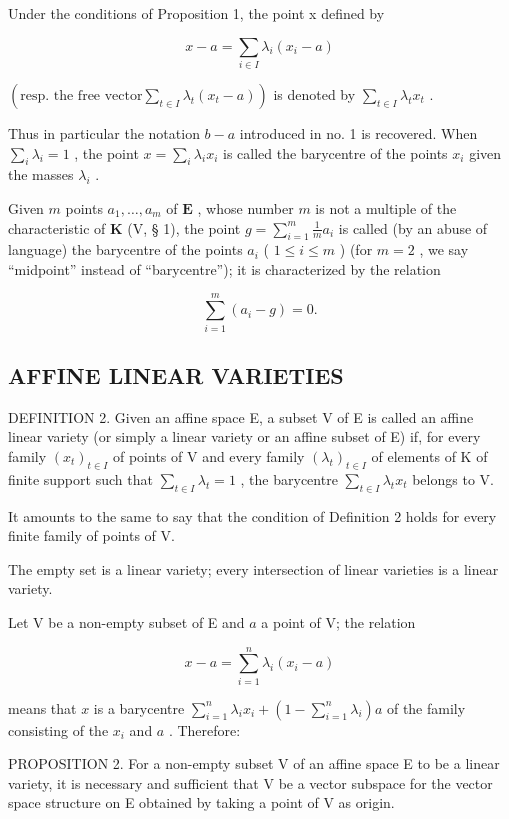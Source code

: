 Under the conditions of Proposition 1, the point x defined by

\[
x - a = \sum_ {i \in I} \lambda_ {i} (x _ {i} - a)
\]

\(\left(\text{resp. the free vector} \sum_{t \in I} \lambda_t(x_t - a)\right)\) is denoted by \(\sum_{t \in I} \lambda_t x_t\) .

Thus in particular the notation \(b - a\) introduced in no. 1 is recovered. When \(\sum_{i} \lambda_{i} = 1\) , the point \(x = \sum_{i} \lambda_{i} x_{i}\) is called the barycentre of the points \(x_{i}\) given the masses \(\lambda_{i}\) .

Given \(m\) points \(a_1, \ldots, a_m\) of \(\mathbf{E}\) , whose number \(m\) is not a multiple of the characteristic of \(\mathbf{K}\) (V, § 1), the point \(g = \sum_{i=1}^{m} \frac{1}{m} a_i\) is called (by an abuse of language) the barycentre of the points \(a_i\) ( \(1 \leqslant i \leqslant m\) ) (for \(m = 2\) , we say ``midpoint'' instead of ``barycentre''); it is characterized by the relation

\[
\sum_ {i = 1} ^ {m} \left(a _ {i} - g\right) = 0.
\]

\subsection{AFFINE LINEAR VARIETIES}

DEFINITION 2. Given an affine space E, a subset V of E is called an affine linear variety (or simply a linear variety or an affine subset of E) if, for every family \((x_{t})_{t\in I}\) of points of V and every family \((\lambda_t)_{t\in I}\) of elements of K of finite support such that \(\sum_{t\in I}\lambda_t = 1\) , the barycentre \(\sum_{t\in I}\lambda_t x_t\) belongs to V.

It amounts to the same to say that the condition of Definition 2 holds for every finite family of points of V.

The empty set is a linear variety; every intersection of linear varieties is a linear variety.

Let V be a non-empty subset of E and \(a\) a point of V; the relation

\[
x - a = \sum_ {i = 1} ^ {n} \lambda_ {i} (x _ {i} - a)
\]

means that \(x\) is a barycentre \(\sum_{i=1}^{n} \lambda_i x_i + \left(1 - \sum_{i=1}^{n} \lambda_i\right)a\) of the family consisting of the \(x_i\) and \(a\) . Therefore:

PROPOSITION 2. For a non-empty subset V of an affine space E to be a linear variety, it is necessary and sufficient that V be a vector subspace for the vector space structure on E obtained by taking a point of V as origin.


